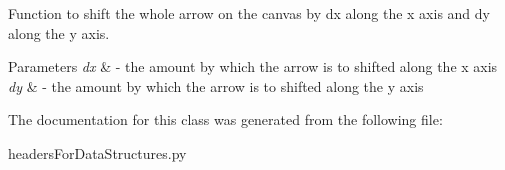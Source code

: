 Function to shift the whole arrow on the canvas by dx along the x axis and dy along the y axis. 


\begin{DoxyParams}{Parameters}
{\em dx} & -\/ the amount by which the arrow is to shifted along the x axis \\
\hline
{\em dy} & -\/ the amount by which the arrow is to shifted along the y axis \\
\hline
\end{DoxyParams}


The documentation for this class was generated from the following file\+:\begin{DoxyCompactItemize}
\item 
headers\+For\+Data\+Structures.\+py\end{DoxyCompactItemize}
